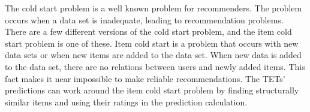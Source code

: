 The cold start problem is a well known problem for recommenders\cite{Ricci2015}\cite{saveski2014item}.
The problem occurs when a data set is inadequate, leading to recommendation problems.
There are a few different versions of the cold start problem, and the item cold start problem is one of these. 
Item cold start is a problem that occurs with new data sets or when new items are added to the data set.
When new data is added to the data set, there are no relations between users and newly added items.
This fact makes it near impossible to make reliable recommendations.
The TETs' predictions can work around the item cold start problem by finding structurally similar items and using their ratings in the prediction calculation.
